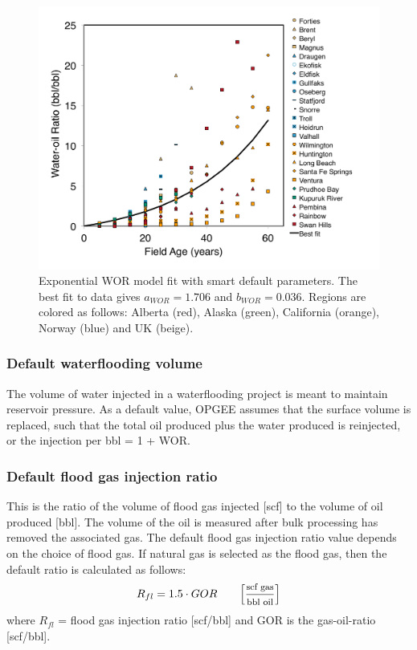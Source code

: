 \documentclass[11pt]{report}
\newcommand{\marg}[1]{{\footnotesize\textit{\textcolor{stanford}{'#1'}}}}
\newcommand{\marginnote}[1]{\marginpar{\marg{#1}}}
\begin{document}
\begin{figure}
\includegraphics[width=1\columnwidth]{images/WOR_plot.pdf}
\caption{Exponential WOR model fit with smart default parameters. The best fit to data gives $a_{WOR} = 1.706$ and $b_{WOR} = 0.036$. Regions are colored as follows: Alberta (red), Alaska (green), California (orange), Norway (blue) and UK (beige).}
\label{fig:exponenital_fit_WOR}
\end{figure}

\subsubsection{Default waterflooding volume}

The volume of water injected in a waterflooding project is meant to maintain reservoir pressure. \marginnote{Active Field 2.4.3} As a default value, OPGEE assumes that the surface volume is replaced, such that the total oil produced plus the water produced is reinjected, or the injection per bbl = 1 + WOR.

\subsubsection{Default flood gas injection ratio}

This is the ratio of the volume of flood gas injected [scf] to the volume of oil produced [bbl]\marginnote{Active Field 2.4.5}. The volume of the oil is measured after bulk processing has removed the associated gas. The default flood gas injection ratio value depends on the choice of flood gas. If natural gas is selected as the flood gas, then the default ratio is calculated as follows:
\begin{equation}\label{eq:NaturalGasAirOxygenFloodGasRatio}
R_{fl}=1.5\cdot GOR \quad\quad \footnotesize{\left[\frac{\text{scf gas}}{\text{bbl oil}}\right]}
\end{equation}
where $R_{fl}$ = flood gas injection ratio [scf/bbl] and GOR is the gas-oil-ratio [scf/bbl].
\end{document}

